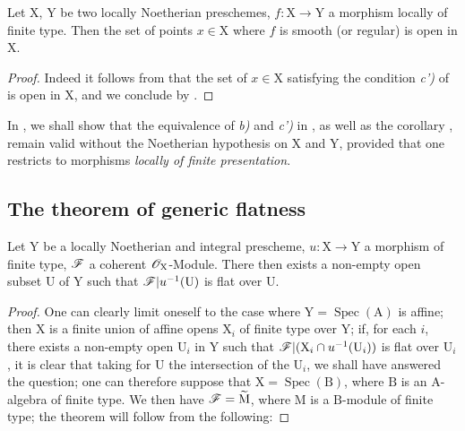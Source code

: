 \begin{corollary}[6.8.7]
\label{IV.6.8.7}
Let $\mathrm{X}$, $\mathrm{Y}$ be two locally Noetherian preschemes, $f:\mathrm{X}\to\mathrm{Y}$ a morphism locally of finite type. Then the set of points $x\in\mathrm{X}$ where $f$ is smooth \textnormal{(}\textup{or} regular\textnormal{)} is open in $\mathrm{X}$.
\end{corollary}

\begin{proof}
Indeed it follows from  that the set of $x\in\mathrm{X}$ satisfying the condition \emph{c')} of  is open in $\mathrm{X}$, and we conclude by .
\end{proof}

\begin{remark}[6.8.8]
\label{IV.6.8.8}
In , we shall show that the equivalence of \emph{b)} and \emph{c')} in , as well as the corollary , remain valid without the Noetherian hypothesis on $\mathrm{X}$ and $\mathrm{Y}$, provided that one restricts to morphisms \emph{locally of finite presentation}.
\end{remark}

\subsection{The theorem of generic flatness}
\label{subsection:IV.6.9}

\begin{theorem}[6.9.1]
\label{IV.6.9.1}
Let $\mathrm{Y}$ be a locally Noetherian and integral prescheme, $u:\mathrm{X}\to\mathrm{Y}$ a morphism of finite type, $\mathscr{F}$ a coherent $\mathscr{O}_\mathrm{X}$-Module. There then exists a non-empty open subset $\mathrm{U}$ of $\mathrm{Y}$ such that $\mathscr{F}|u^{-1}(\mathrm{U})$ is flat over $\mathrm{U}$.
\end{theorem}

\begin{proof}
One can clearly limit oneself to the case where $\mathrm{Y}=\operatorname{Spec}(\mathrm{A})$ is affine; then $\mathrm{X}$ is a finite union of affine opens $\mathrm{X}_i$ of finite type over $\mathrm{Y}$; if, for each $i$, there exists a non-empty open $\mathrm{U}_i$ in $\mathrm{Y}$ such that $\mathscr{F}|(\mathrm{X}_i\cap u^{-1}(\mathrm{U}_i))$ is flat over $\mathrm{U}_i$, it is clear that taking for $\mathrm{U}$ the intersection of the $\mathrm{U}_i$, we shall have answered the question; one can therefore suppose that $\mathrm{X}=\operatorname{Spec}(\mathrm{B})$, where $\mathrm{B}$ is an $\mathrm{A}$-algebra of finite type. We then have $\mathscr{F}=\widetilde{\mathrm{M}}$, where $\mathrm{M}$ is a $\mathrm{B}$-module of finite type; the theorem will follow from the following:
\end{proof}

